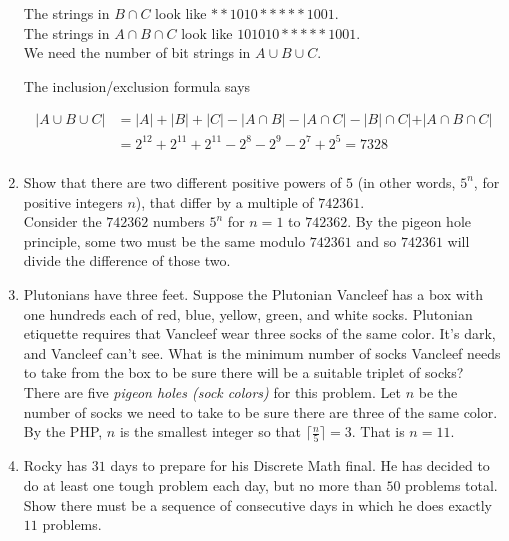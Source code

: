 \documentclass[11pt]{amsart}
\begin{document}
\begin{enumerate}
{The strings in $B\cap C$ look like $* * 1010 * * * * * 1001$.\\[3pt]

The strings in $A\cap B\cap C$ look like $101010 * * * * * 1001$.\\[3pt]

We need the number of bit strings in $A\cup B\cup C$.

The inclusion/exclusion formula says

\begin{align*}
| A\cup B\cup C| &= |A| +|B| + |C| -|A\cap B| - |A\cap C| - |B|\cap C| +|A\cap B\cap C|\\
&= 2^{12}+2^{11} +2^{11} - 2^{8} - 2^{9}- 2^{7} + 2^{5} = 7328\\[5pt]
\end{align*}
}

\item  Show that there are two different positive powers of $5$ (in other words, $5^{n}$, for positive integers $n$),  that differ by a multiple of $742361$.\\[3pt]

{\color{blue} Consider the $742362$ numbers $5^{n}$ for $n = 1$ to $742362$. By the pigeon hole principle,
some two must be the same modulo $742361$ and so $742361$ will divide the difference of those two.\\[5pt]
}

\item Plutonians have three feet. Suppose the Plutonian Vancleef has a box with one hundreds each of red, blue, yellow, green, and white socks. Plutonian etiquette requires that Vancleef wear three socks of the same color.  It's dark, and Vancleef can't see. What is the minimum number of socks Vancleef needs to take from the box to be sure there will be a suitable triplet of socks?\\[3pt]

{\color{blue} There are five {\itshape pigeon holes (sock colors)} for this problem.  Let $n$ be the number of socks we need to take to be sure there are three of the same color. By the PHP,  $n$  is the smallest integer so that
$\displaystyle \lceil{\frac{n}{5}}\rceil = 3$. That is $n = 11$.\\[5pt]
}

\item Rocky has $31$ days to prepare for his Discrete Math final. He has decided to do at least one tough problem each day, but no more than
$50$ problems total. Show there must be a sequence of consecutive days in which he does exactly $11$ problems.\\[3pt]


\end{enumerate}
\end{document}
